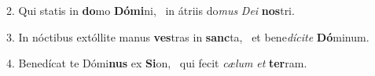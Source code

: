 2. Qui statis in \textbf{do}mo \textbf{Dó}\textbf{mi}ni, \ast\  in átriis do\textit{mus} \textit{De}\textit{i} \textbf{nos}tri.\

3. In nóctibus extóllite manus \textbf{ves}tras in \textbf{sanc}ta, \ast\  et bene\textit{dí}\textit{ci}\textit{te} \textbf{Dó}minum.\

4. Benedícat te Dómi\textbf{nus} ex \textbf{Si}on, \ast\  qui fecit \textit{cæ}\textit{lum} \textit{et} \textbf{ter}ram.\

